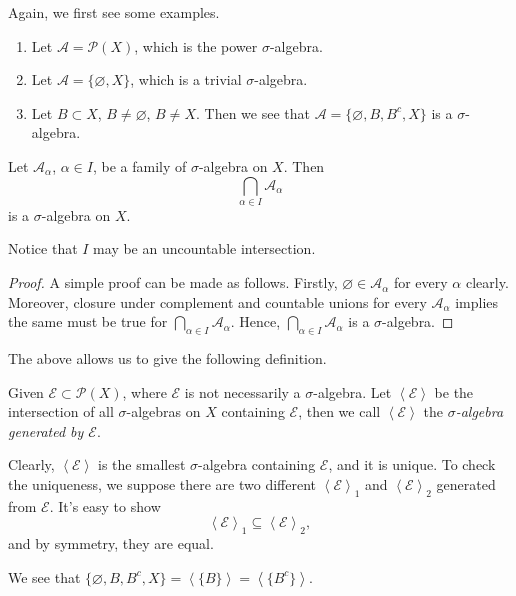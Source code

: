 \begin{eg}
	Again, we first see some examples.
	\begin{enumerate}
		\item Let \(\mathcal{A} = \mathcal{P} (X)\), which is the power \(\sigma\)-algebra.
		\item Let \(\mathcal{A} = \{\varnothing , X\}\), which is a trivial \(\sigma\)-algebra.
		\item Let \(B\subset X\), \(B\neq \varnothing \), \(B\neq X\). Then we see that \(\mathcal{A} = \{\varnothing , B, B^{c}, X\}\) is a \(\sigma\)-algebra.
	\end{enumerate}
\end{eg}

\begin{lemma}
	Let \(\mathcal{A}_{\alpha}\), \(\alpha\in I\), be a family of \(\sigma\)-algebra on \(X\). Then
	\[
		\bigcap\limits_{\alpha\in I} \mathcal{A}_{\alpha}
	\]
	is a \(\sigma\)-algebra on \(X\).
\end{lemma}
\begin{remark}
	Notice that \(I\) may be an uncountable intersection.
\end{remark}
\begin{proof}
	A simple proof can be made as follows. Firstly, \(\varnothing \in \mathcal{A}_{\alpha}\) for every \(\alpha\) clearly.
	Moreover, closure under complement and countable unions for every \(\mathcal{A}_{\alpha}\) implies the same must be true for \(\bigcap\limits_{\alpha\in I} \mathcal{A}_{\alpha}\).
	Hence, \(\bigcap\limits_{\alpha\in I} \mathcal{A}_{\alpha}\) is a \(\sigma\)-algebra.
\end{proof}

The above allows us to give the following definition.
\begin{definition}
	Given \(\mathcal{E} \subset \mathcal{P} (X) \), where \(\mathcal{E}\) is not necessarily a \(\sigma\)-algebra. Let
	\(\left<\mathcal{E}\right>\) be the intersection of all \(\sigma\)-algebras on \(X\) containing \(\mathcal{E}\), then
	we call \(\left<\mathcal{E} \right>\) the \emph{\(\sigma\)-algebra generated by \(\mathcal{E}\)}.
\end{definition}

\begin{remark}
	Clearly, \(\left<\mathcal{E} \right>\) is the smallest \(\sigma\)-algebra containing \(\mathcal{E}\), and it is unique.
	To check the uniqueness, we suppose there are two different \(\left<\mathcal{E}\right>_1\) and \(\left<\mathcal{E}\right>_2\)
	generated from \(\mathcal{E} \). It's easy to show
	\[
		\left<\mathcal{E}\right>_1\subseteq \left<\mathcal{E}\right>_2,
	\]
	and by symmetry, they are equal.
\end{remark}
\begin{eg}
	We see that \(\{\varnothing , B, B^{c} , X\}= \left<\{B\}\right> = \left<\{B^{c} \}\right>\).
\end{eg}

